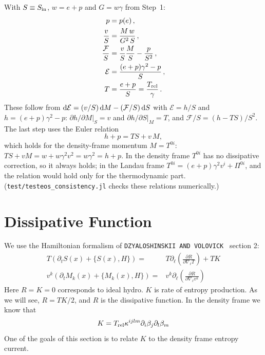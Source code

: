 \documentclass[12pt,aps,preprint,nofootinbib,noshowkeys,noshowpacs,longbibliography,superscriptaddress,tightenlines]{revtex4-2}
\def\F{{\mathcal F}}
\def\st{\begin{equation}}
\def\stp{\end{equation}}
\def\E{{\mathcal E}}
\def\dd{{\rm d}}
\begin{document}
With $S \equiv S_{\rm in}$, $w=e+p$ and $G=w\gamma$ from Step~1:
\begin{align}
    p =& \; p(e) \, , \\
    \frac{v}{S} =& \; \frac{M\,w}{G^2\,S} \, , \\
    \frac{\F}{S} =& \; \frac{v}{S}\frac{M}{S} - \frac{p}{S^2} \, , \\
    \E =& \; \frac{(e+p)\gamma^2 - p}{S} \, , \\
    T =& \; \frac{e+p}{S} = \frac{T_{\rm rel}}{\gamma} \, .
\end{align}
These follow from $\dd\E=(v/S)\,\dd M-(\F/S)\,\dd S$ with $\E=h/S$ and
$h=(e+p)\gamma^2-p$: $\partial h/\partial M|_S=v$ and $\partial h/\partial S|_M=T$, and
$\F/S=(h-TS)/S^2$.  The last step uses the Euler relation
\st
h+p=TS+v\,M ,
\stp
which holds for the density-frame momentum $M=T^{0i}$: $TS+vM=w+w\gamma^2v^2=w\gamma^2=h+p$.
In the density frame $T^{0i}$ has no dissipative correction, so it always holds;
in the Landau frame $T^{0i}=(e+p)\gamma^2v^i+\Pi^{0i}$, and the relation would
hold only for the thermodynamic part.
(\texttt{test/testeos\_consistency.jl} checks these relations numerically.)

\section{Dissipative Function}

We use the Hamiltonian formalism of  {\tt DZYALOSHINSKII AND VOLOVICK } section 2:
\begin{align}
    T \left(\partial_t S(x)  +\{S(x), H \} \right) =&     
    T \partial_\ell \left(\frac{\partial R }{ \partial \nabla_\ell T  }   \right)  + T K \\         
    v^k \left(\partial_t M_k(x)  + \{M_k(x), H \}  \right)=&   
v^k \partial_\ell \left( \frac{\partial R }{  \partial \nabla_\ell v^k  }  \right)
\end{align}
Here $R=K=0$ corresponds to ideal hydro.  $K$ is rate of entropy production.   As we will see,  $R = T K/2$, and $R$ is the dissipative function. In the density frame we know that
\st
K = T_{\rm rel} \kappa^{ijlm} \partial_i\beta_j \partial_l \beta_m
\stp
One of the goals of this section is to relate $K$ to the density frame entropy current. 
\end{document}
